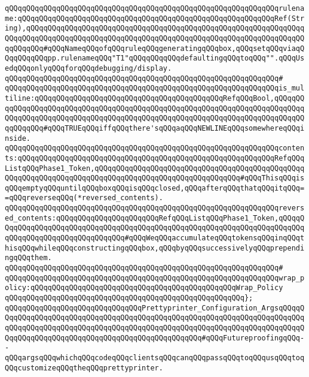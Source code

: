 \verb|qQQqqQQqqQQqqQQqqQQqqQQqqQQqqQQqqQQqqQQqqQQqqQQqqQQqqQQqqQQqqQQqrulename:qQQqqQQqqQQqqQQqqQQqqQQqqQQqqQQqqQQqqQQqqQQqqQQqqQQqqQQqqQQqRef(String),qQQqqQQqqQQqqQQqqQQqqQQqqQQqqQQqqQQqqQQqqQQqqQQqqQQqqQQqqQQqqQQqqQQqqQQqqQQqqQQqqQQqqQQqqQQqqQQqqQQqqQQqqQQqqQQqqQQqqQQqqQQqqQQqqQQqqQQqqQQqqQQq#qQQqNameqQQqofqQQqruleqQQqgeneratingqQQqbox,qQQqsetqQQqviaqQQqqQQqqQQqpp.rulenameqQQq"T1"qQQqqQQqqQQqdefaultingqQQqtoqQQq"".qQQqUsedqQQqonlyqQQqforqQQqdebugging/display.|\newline
\verb|qQQqqQQqqQQqqQQqqQQqqQQqqQQqqQQqqQQqqQQqqQQqqQQqqQQqqQQqqQQqqQQq#|\newline
\verb|qQQqqQQqqQQqqQQqqQQqqQQqqQQqqQQqqQQqqQQqqQQqqQQqqQQqqQQqqQQqqQQqis_multiline:qQQqqQQqqQQqqQQqqQQqqQQqqQQqqQQqqQQqqQQqqQQqRefqQQqBool,qQQqqQQqqQQqqQQqqQQqqQQqqQQqqQQqqQQqqQQqqQQqqQQqqQQqqQQqqQQqqQQqqQQqqQQqqQQqqQQqqQQqqQQqqQQqqQQqqQQqqQQqqQQqqQQqqQQqqQQqqQQqqQQqqQQqqQQqqQQqqQQqqQQqqQQqqQQq#qQQqTRUEqQQqiffqQQqthere'sqQQqaqQQqNEWLINEqQQqsomewhereqQQqinside.|\newline
\verb|qQQqqQQqqQQqqQQqqQQqqQQqqQQqqQQqqQQqqQQqqQQqqQQqqQQqqQQqqQQqqQQqcontents:qQQqqQQqqQQqqQQqqQQqqQQqqQQqqQQqqQQqqQQqqQQqqQQqqQQqqQQqqQQqRefqQQqListqQQqPhase1_Token,qQQqqQQqqQQqqQQqqQQqqQQqqQQqqQQqqQQqqQQqqQQqqQQqqQQqqQQqqQQqqQQqqQQqqQQqqQQqqQQqqQQqqQQqqQQqqQQqqQQqqQQq#qQQqThisqQQqisqQQqemptyqQQquntilqQQqboxqQQqisqQQqclosed,qQQqafterqQQqthatqQQqitqQQq==qQQqreverseqQQq(*reversed_contents).|\newline
\verb|qQQqqQQqqQQqqQQqqQQqqQQqqQQqqQQqqQQqqQQqqQQqqQQqqQQqqQQqqQQqqQQqreversed_contents:qQQqqQQqqQQqqQQqqQQqqQQqRefqQQqListqQQqPhase1_Token,qQQqqQQqqQQqqQQqqQQqqQQqqQQqqQQqqQQqqQQqqQQqqQQqqQQqqQQqqQQqqQQqqQQqqQQqqQQqqQQqqQQqqQQqqQQqqQQqqQQqqQQq#qQQqWeqQQqaccumulateqQQqtokensqQQqinqQQqthisqQQqwhileqQQqconstructingqQQqbox,qQQqbyqQQqsuccessivelyqQQqprependingqQQqthem.|\newline
\verb|qQQqqQQqqQQqqQQqqQQqqQQqqQQqqQQqqQQqqQQqqQQqqQQqqQQqqQQqqQQqqQQq#|\newline
\verb|qQQqqQQqqQQqqQQqqQQqqQQqqQQqqQQqqQQqqQQqqQQqqQQqqQQqqQQqqQQqqQQqwrap_policy:qQQqqQQqqQQqqQQqqQQqqQQqqQQqqQQqqQQqqQQqqQQqqQQqWrap_Policy|\newline
\verb|qQQqqQQqqQQqqQQqqQQqqQQqqQQqqQQqqQQqqQQqqQQqqQQqqQQqqQQq};|\newline
\newline
\verb|qQQqqQQqqQQqqQQqqQQqqQQqqQQqqQQqPrettyprinter_Configuration_ArgsqQQqqQQqqQQqqQQqqQQqqQQqqQQqqQQqqQQqqQQqqQQqqQQqqQQqqQQqqQQqqQQqqQQqqQQqqQQqqQQqqQQqqQQqqQQqqQQqqQQqqQQqqQQqqQQqqQQqqQQqqQQqqQQqqQQqqQQqqQQqqQQqqQQqqQQqqQQqqQQqqQQqqQQqqQQqqQQqqQQqqQQqqQQqqQQq#qQQqFutureproofingqQQq--qQQqargsqQQqwhichqQQqcodeqQQqclientsqQQqcanqQQqpassqQQqtoqQQqusqQQqtoqQQqcustomizeqQQqtheqQQqprettyprinter.|\newline
